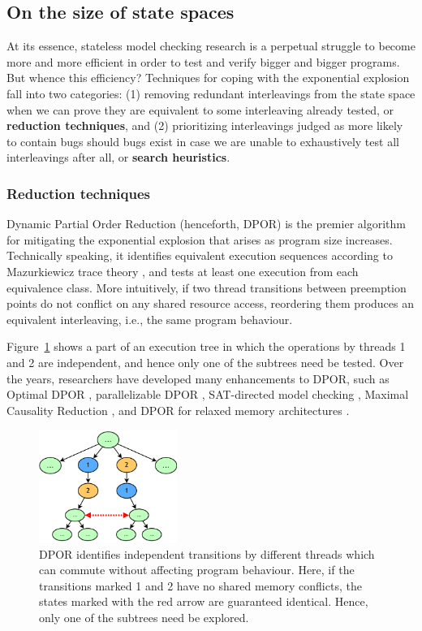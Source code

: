 \subsection{On the size of state spaces}

At its essence, stateless model checking research is a perpetual struggle to become more and more efficient in order to test and verify bigger and bigger programs.
But whence this efficiency?
Techniques for coping with the exponential explosion fall into two categories:
(1) removing redundant interleavings from the state space when we can prove they are equivalent to some interleaving already tested,
or {\bf reduction techniques},
and
(2) prioritizing interleavings judged as more likely to contain bugs should bugs exist
in case we are unable to exhaustively test all interleavings after all,
or {\bf search heuristics}.

\subsubsection{Reduction techniques}

Dynamic Partial Order Reduction \cite{dpor} (henceforth, DPOR) is the premier algorithm for mitigating the exponential explosion that arises as program size increases.
Technically speaking, it identifies equivalent execution sequences according to Mazurkiewicz trace theory \cite{mazurkiewicz},
and tests at least one execution from each equivalence class.
More intuitively, if two thread transitions between preemption points do not conflict on any shared resource access, reordering them produces an equivalent interleaving, i.e., the same program behaviour.

Figure~\ref{fig:dpor} shows a part of an execution tree in which the operations by threads 1 and 2 are independent, and hence only one of the subtrees need be tested.
Over the years, researchers have developed many enhancements to DPOR, such as Optimal DPOR \cite{optimal-dpor}, parallelizable DPOR \cite{parallel-dpor}, SAT-directed model checking \cite{satcheck}, Maximal Causality Reduction \cite{mcr}, and DPOR for relaxed memory architectures \cite{tsopso}.

\begin{figure}[t]
	\begin{center}
	\includegraphics[width=0.4\textwidth]{dpor.pdf}
	\end{center}
	\caption{DPOR identifies independent transitions by different threads which can commute without affecting program behaviour. Here, if the transitions marked 1 and 2 have no shared memory conflicts, the states marked with the red arrow are guaranteed identical. Hence, only one of the subtrees need be explored.}
	\label{fig:dpor}
\end{figure}

